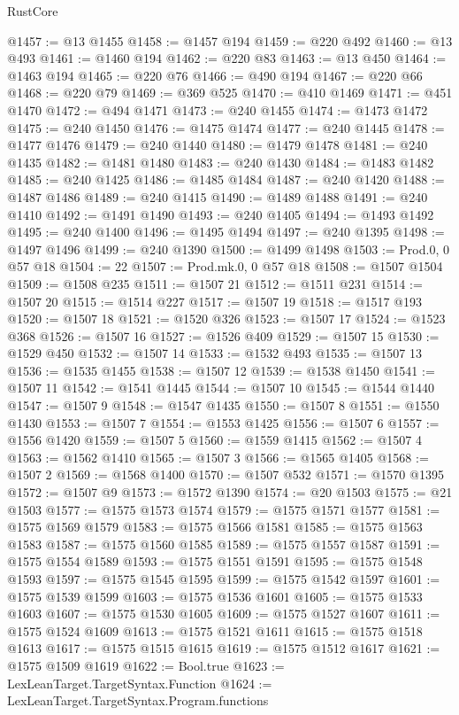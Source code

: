 \begin{lexlean}{RustCore}
\begin{coremodule}
@1457 := @13 @1455
@1458 := @1457 @194
@1459 := @220 @492
@1460 := @13 @493
@1461 := @1460 @194
@1462 := @220 @83
@1463 := @13 @450
@1464 := @1463 @194
@1465 := @220 @76
@1466 := @490 @194
@1467 := @220 @66
@1468 := @220 @79
@1469 := @369 @525
@1470 := @410 @1469
@1471 := @451 @1470
@1472 := @494 @1471
@1473 := @240 @1455
@1474 := @1473 @1472
@1475 := @240 @1450
@1476 := @1475 @1474
@1477 := @240 @1445
@1478 := @1477 @1476
@1479 := @240 @1440
@1480 := @1479 @1478
@1481 := @240 @1435
@1482 := @1481 @1480
@1483 := @240 @1430
@1484 := @1483 @1482
@1485 := @240 @1425
@1486 := @1485 @1484
@1487 := @240 @1420
@1488 := @1487 @1486
@1489 := @240 @1415
@1490 := @1489 @1488
@1491 := @240 @1410
@1492 := @1491 @1490
@1493 := @240 @1405
@1494 := @1493 @1492
@1495 := @240 @1400
@1496 := @1495 @1494
@1497 := @240 @1395
@1498 := @1497 @1496
@1499 := @240 @1390
@1500 := @1499 @1498
@1503 := Prod.{0, 0} @57 @18
@1504 := 22
@1507 := Prod.mk.{0, 0} @57 @18
@1508 := @1507 @1504
@1509 := @1508 @235
@1511 := @1507 21
@1512 := @1511 @231
@1514 := @1507 20
@1515 := @1514 @227
@1517 := @1507 19
@1518 := @1517 @193
@1520 := @1507 18
@1521 := @1520 @326
@1523 := @1507 17
@1524 := @1523 @368
@1526 := @1507 16
@1527 := @1526 @409
@1529 := @1507 15
@1530 := @1529 @450
@1532 := @1507 14
@1533 := @1532 @493
@1535 := @1507 13
@1536 := @1535 @1455
@1538 := @1507 12
@1539 := @1538 @1450
@1541 := @1507 11
@1542 := @1541 @1445
@1544 := @1507 10
@1545 := @1544 @1440
@1547 := @1507 9
@1548 := @1547 @1435
@1550 := @1507 8
@1551 := @1550 @1430
@1553 := @1507 7
@1554 := @1553 @1425
@1556 := @1507 6
@1557 := @1556 @1420
@1559 := @1507 5
@1560 := @1559 @1415
@1562 := @1507 4
@1563 := @1562 @1410
@1565 := @1507 3
@1566 := @1565 @1405
@1568 := @1507 2
@1569 := @1568 @1400
@1570 := @1507 @532
@1571 := @1570 @1395
@1572 := @1507 @9
@1573 := @1572 @1390
@1574 := @20 @1503
@1575 := @21 @1503
@1577 := @1575 @1573 @1574
@1579 := @1575 @1571 @1577
@1581 := @1575 @1569 @1579
@1583 := @1575 @1566 @1581
@1585 := @1575 @1563 @1583
@1587 := @1575 @1560 @1585
@1589 := @1575 @1557 @1587
@1591 := @1575 @1554 @1589
@1593 := @1575 @1551 @1591
@1595 := @1575 @1548 @1593
@1597 := @1575 @1545 @1595
@1599 := @1575 @1542 @1597
@1601 := @1575 @1539 @1599
@1603 := @1575 @1536 @1601
@1605 := @1575 @1533 @1603
@1607 := @1575 @1530 @1605
@1609 := @1575 @1527 @1607
@1611 := @1575 @1524 @1609
@1613 := @1575 @1521 @1611
@1615 := @1575 @1518 @1613
@1617 := @1575 @1515 @1615
@1619 := @1575 @1512 @1617
@1621 := @1575 @1509 @1619
@1622 := Bool.true
@1623 := LexLeanTarget.TargetSyntax.Function
@1624 := LexLeanTarget.TargetSyntax.Program.functions

\end{coremodule}
\end{lexlean}
